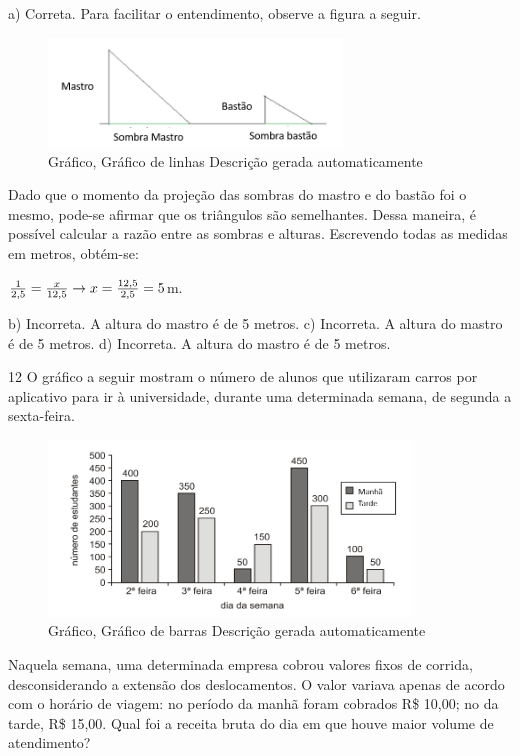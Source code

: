 \begin{escolha}
\begin{escolha}
\begin{escolha}
\begin{escolha}
{\begin{boxmedio}
\begin{boxpeq}
\begin{q°}
\begin{boxmedio}
\begin{boxpeq}
\begin{boxpeq}
\begin{boxmedio}
\begin{boxmedio}
\begin{boxmedio}
\begin{largebox}
\begin{boxmedio}
{{a) Correta. Para facilitar o entendimento, observe a figura a seguir.

\begin{figure}
\centering
\includegraphics[width=3.06771in,height=1.1397in]{./_SAEB_9_MAT/media/image257.png}
\caption{Gráfico, Gráfico de linhas Descrição gerada automaticamente}
\end{figure}


Dado que o momento da projeção das sombras do mastro e do bastão foi o
mesmo, pode-se afirmar que os triângulos são semelhantes. Dessa maneira, 
é possível calcular a razão entre as sombras e alturas.
Escrevendo todas as medidas em metros, obtém-se:

$\frac{1}{2,5} = \frac{x}{12,5} \rightarrow \\
x = \frac{12,5}{2,5} = 5$m.

b) Incorreta. A altura do mastro é de 5 metros.
c) Incorreta. A altura do mastro é de 5 metros.
d) Incorreta. A altura do mastro é de 5 metros.}

\num{12} O gráfico a seguir mostram o número de alunos que utilizaram
carros por aplicativo para ir à universidade, durante uma determinada
semana, de segunda a sexta-feira.

\begin{figure}
\centering
\includegraphics[width=3.79687in,height=1.84263in]{./_SAEB_9_MAT/media/image258.png}
\caption{Gráfico, Gráfico de barras Descrição gerada automaticamente}
\end{figure}

Naquela semana, uma determinada empresa cobrou valores fixos de corrida,
desconsiderando a extensão dos deslocamentos. O valor variava apenas de 
acordo com o horário de viagem: no período da manhã foram cobrados 
R\$ 10,00; no da tarde, R\$ 15,00. Qual foi a receita bruta do dia 
em que houve maior volume de atendimento?

}
\end{boxmedio}
\end{largebox}
\end{boxmedio}
\end{boxmedio}
\end{boxmedio}
\end{boxpeq}
\end{boxpeq}
\end{boxmedio}
\end{q°}
\end{boxpeq}
\end{boxmedio}}
\end{escolha}
\end{escolha}
\end{escolha}
\end{escolha}

